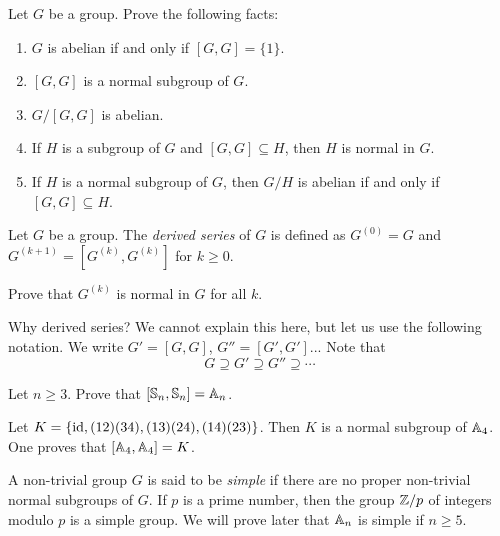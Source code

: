 \begin{exercise}
    Let $G$ be a group. 
    Prove the following facts:
    \begin{enumerate}
        \item $G$ is abelian if and only if $[G,G]=\{1\}$.
        \item $[G,G]$ is a normal subgroup of $G$. 
        \item $G/[G,G]$ is abelian. 
        \item If $H$ is a subgroup of $G$ and $[G,G]\subseteq H$, then 
        $H$ is normal in $G$.
        \item If $H$ is a normal subgroup of $G$, then 
        $G/H$ is abelian if and only if $[G,G]\subseteq H$. 
    \end{enumerate}
\end{exercise}

\begin{definition}
    Let $G$ be a group. The \emph{derived series} of $G$ 
    is defined as $G^{(0)}=G$ and
    $G^{(k+1)}=[G^{(k)},G^{(k)}]$ for $k\geq 0$. 
\end{definition}

\begin{exercise}
    Prove that $G^{(k)}$ is normal in $G$ for all $k$. 
\end{exercise}

Why derived series? We cannot explain this here, but let us use the following
notation. 
We write $G'=[G,G]$, $G''=[G',G']$... 
Note that 
\[
G\supseteq G'\supseteq G''\supseteq\cdots
\]


\begin{exercise}
    Let $n\geq3$. Prove that 
    $[\mathbb{S}_n,\mathbb{S}_n]=\mathbb{A}_n$. 
\end{exercise}

\begin{example}
    Let $K=\{\operatorname{id},(12)(34),(13)(24),(14)(23)\}$. Then 
    $K$ is a normal subgroup of $\mathbb{A}_4$. 
    One proves that $[\mathbb{A}_4,\mathbb{A}_4]=K$. 
\end{example}

A non-trivial group $G$ is said to be \emph{simple} 
if there are no proper non-trivial normal subgroups of $G$. If $p$
is a prime number, then the group 
$\mathbb{Z}/p$ of integers modulo $p$ 
is a simple group. We will prove
later that $\mathbb{A}_n$ is simple if 
$n\geq5$. 

